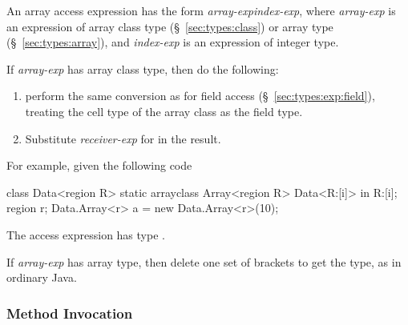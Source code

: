 An array access expression has the form
\emph{array-exp}\kwd{[}\emph{index-exp}\kwd{]}, where \emph{array-exp}
is an expression of array class type (\S~\ref{sec:types:class}) or
array type (\S~\ref{sec:types:array}), and \emph{index-exp} is an
expression of integer type.

 If \emph{array-exp} has array class type,
then do the following:
%
\begin{enumerate}
%
\item perform the same conversion as for field access
  (\S~\ref{sec:types:exp:field}), treating the cell type of the array
  class as the field type.
%
\item Substitute \emph{receiver-exp} for  in the result.
%
\end{enumerate}
%
For example, given the following code
%
\begin{dpjlisting}
class Data<region R> {
    static arrayclass Array<region R> {
        Data<R:[i]> in R:[i];
    }
}
region r;
Data.Array<r> a = new Data.Array<r>(10);
\end{dpjlisting}
%
The access expression  has type .

 If \emph{array-exp} has array type, then delete
one set of brackets to get the type, as in ordinary Java.

\subsubsection{Method Invocation%
\label{sec:types:exp:invoke}}

